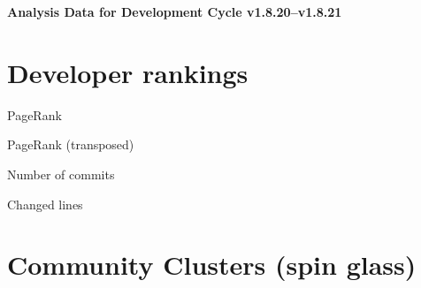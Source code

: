\documentclass{article}
\begin{document}
\setlength{\parindent}{0pt}
\begin{center}
\begin{Large}
\textbf{Analysis Data for Development Cycle v1.8.20--v1.8.21}
\end{Large}
\end{center}
\section{Developer rankings}
\begin{small}\renewcommand{\tabcolsep}{1pt}
\begin{minipage}{0.5\linewidth}
PageRank\\

\end{minipage}%
\begin{minipage}{0.5\linewidth}
PageRank (transposed)\\

\end{minipage}

\renewcommand{\tabcolsep}{5pt}
\begin{minipage}{0.5\linewidth}
Number of commits\\

\end{minipage}%
\begin{minipage}{0.5\linewidth}
Changed lines\\

\end{minipage}
\end{small}
\newpage\section{Community Clusters (spin glass)}
\end{document}

